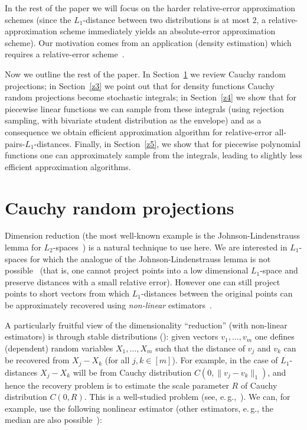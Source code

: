 \documentclass[11pt]{article}
\begin{document}
In the rest of the paper we will focus on the harder relative-error approximation
schemes (since the $L_1$-distance between two distributions is at most $2$,
a relative-approximation scheme immediately yields an absolute-error approximation scheme).
Our motivation comes from an application (density estimation) which requires a
relative-error scheme~\cite{MS08}.

Now we outline the rest of the paper. In Section~\ref{z2} we review Cauchy random projections;
in Section~\ref{z3} we point out that for density functions Cauchy random projections become stochastic
integrals; in Section~\ref{z4} we show that for piecewise linear functions we can sample from these
integrals (using rejection sampling, with bivariate student distribution as the envelope) and
as a consequence we obtain efficient approximation algorithm for relative-error all-pairs-$L_1$-distances.
Finally, in Section~\ref{z5}, we show that for piecewise polynomial functions one can
approximately sample from the integrals, leading to slightly less efficient approximation algorithms.


\section{Cauchy random projections}\label{z2}

Dimension reduction (the most well-known example is the Johnson-Lindenstrauss lemma
for $L_2$-spaces~\cite{JL84}) is a natural technique to use here. We are interested in
$L_1$-spaces for which the
analogue of the Johnson-Lindenstrauss lemma is not possible~\cite{BC05,LN04} (that is,
one cannot project points into a low dimensional $L_1$-space and preserve distances
with a small relative error). However one can still project points to short vectors from
which $L_1$-distances between the original points can be approximately recovered
using {\em non-linear} estimators~\cite{LHC07,I06}.

A particularly fruitful view of the dimensionality ``reduction'' (with non-linear estimators)
is through stable distributions (\cite{JS82,I06}): given vectors $v_1,\dots,v_m$ one defines
(dependent) random variables $X_1,\dots,X_m$ such that the distance of $v_j$ and $v_k$ can be
recovered from $X_j-X_k$ (for all $j,k\in [m]$). For example, in the case of $L_1$-distances
$X_j-X_k$ will be from Cauchy distribution $C(0,\|v_j-v_k\|_1)$, and hence the recovery problem is
to estimate the scale parameter $R$ of Cauchy distribution $C(0,R)$. This
is a well-studied problem (see, e.\,g.,~\cite{HBA70}). We can, for example, use the following nonlinear
estimator (other estimators, e.\,g., the median are also possible~\cite{I06}):
\end{document}

